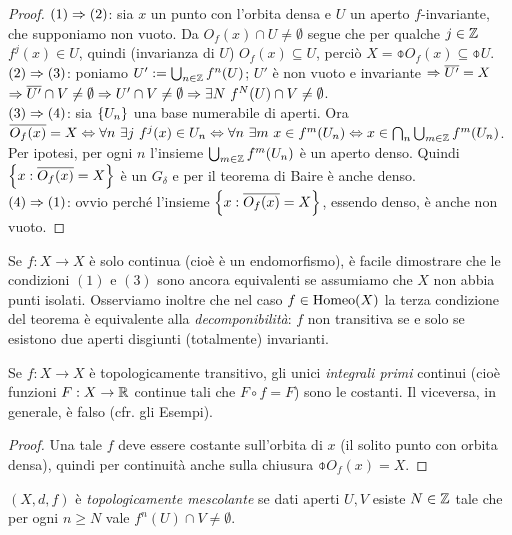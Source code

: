 \begin{proof}$(1)\Rightarrow (2)$: sia $x$ un punto con l'orbita densa e $U$ un aperto $f$-invariante, che supponiamo non vuoto.
Da $O_f(x)\cap U\neq\emptyset$ segue che per qualche $j\in\mathbb{Z}$ $f^j(x)\in U$, quindi (invarianza di $U$) $O_f(x)\subseteq U$,
perciò $X=\obar{O_f(x)}\subseteq\obar{U}$. \\
$(2)\Rightarrow (3)$: poniamo $U':=\bigcup_{n\in\mathbb{Z}}f^n(U)$; $U'$ è non vuoto e invariante $\Rightarrow\overline{U'}=X$
$\Rightarrow \overline{U'}\cap V\neq\emptyset \Rightarrow U'\cap V\neq\emptyset \Rightarrow \exists N\ f^N(U)\cap V\neq\emptyset$. \\
$(3)\Rightarrow(4)$: sia $\left\{U_n\right\}$ una base numerabile di aperti. Ora $\obar{O_f(x)}=X\sse \forall n\ \exists j\ f^j(x)\in U_n
\sse \forall n\ \exists m\ x\in f^m(U_n)\sse x\in\bigcap_n\bigcup_{m\in\Z} f^m(U_n)$.
Per ipotesi, per ogni $n$ l'insieme $\bigcup_{m\in\mathbb{Z}} f^m(U_n)$ è un aperto denso.
Quindi $\left\{x:\overline{O_f(x)}=X\right\}$ è un $G_\delta$ e per il teorema di Baire è anche denso. \\
$(4)\Rightarrow (1)$: ovvio perché l'insieme $\left\{x:\overline{O_f(x)}=X\right\}$, essendo denso, è anche non vuoto.
\end{proof}

\begin{oss}\label{osstransitivita} Se $f:X\to X$ è solo continua (cioè è un endomorfismo), è facile dimostrare che le condizioni $(1)$ e $(3)$ sono
  ancora equivalenti se assumiamo che $X$ non abbia punti isolati.\newline
  Osserviamo inoltre che nel caso $f\in\operatorname{Homeo} (X)$ la terza condizione del teorema è equivalente alla \emph{decomponibilità}: 
  $f$ non transitiva se e solo se esistono due aperti disgiunti (totalmente) invarianti.
\end{oss}

\begin{prop}Se $f:X\to X$ è topologicamente transitivo, gli unici \emph{integrali primi} continui (cioè
funzioni $F:X\to\mathbb{R}$ continue tali che $F\circ f=F$) sono le costanti. Il viceversa, in generale, è falso (cfr. gli Esempi).
\end{prop}

\begin{proof}Una tale $f$ deve essere costante sull'orbita di $x$ (il solito punto con orbita densa), quindi per continuità anche
sulla chiusura $\obar{O_f(x)}=X$.
\end{proof}

\begin{defi} $(X,d,f)$ è \emph{topologicamente mescolante} se dati aperti $U,V$ esiste $N\in\mathbb{Z}$ tale che per ogni $n\geq N$ vale $f^n(U)\cap V\neq \emptyset$.\end{defi}

